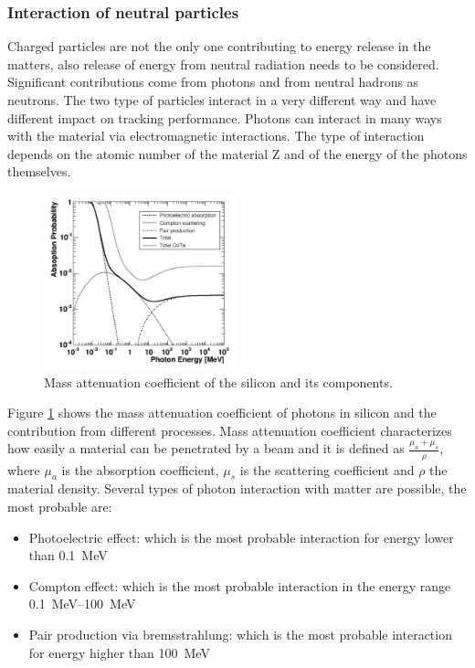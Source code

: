 \subsubsection{Interaction of neutral particles}
Charged particles are not the only one contributing to energy release in the matters, also release of energy from neutral radiation needs to be considered.
Significant contributions come from photons and from neutral hadrons as neutrons. The two type of particles interact in a very different way and have different impact on tracking performance.
Photons can interact in many ways with the material via electromagnetic interactions. The type of interaction depends on the atomic number of the material Z and of the energy of the photons themselves.
\begin{figure}
\center
\includegraphics[width=0.5\textwidth]{Images/tracking_det/photon_interaction.png}
\caption{Mass attenuation coefficient of the silicon and its components.}
\label{pic:photon_interaction}
\end{figure}
Figure \ref{pic:photon_interaction} shows the mass attenuation coefficient of photons in silicon and the contribution from different processes. Mass attenuation coefficient characterizes how easily a material can be penetrated by a beam and it is defined as $\frac{\mu_a + \mu_s}{\rho}$, where $\mu_a$ is the absorption coefficient, $\mu_s$ is the scattering coefficient and $\rho$ the material density. Several types of photon interaction with matter are possible, the most probable are:
\begin{itemize}
\item Photoelectric effect: which is the most probable interaction for energy lower than \SI{0.1}{\MeV}
\item Compton effect: which is the most probable interaction in the energy range \SIrange{0.1}{100}{\MeV}
\item Pair production via bremsstrahlung: which is the most probable interaction for energy higher than \SI{100}{\MeV}
\end{itemize}
